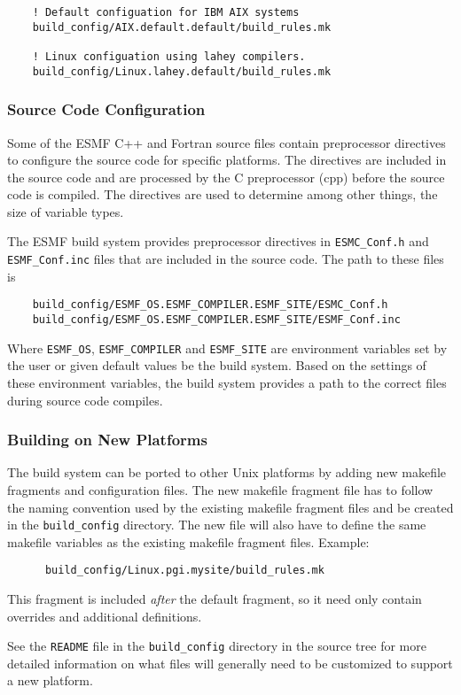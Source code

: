 \begin{verbatim}
    ! Default configuation for IBM AIX systems
    build_config/AIX.default.default/build_rules.mk
    
    ! Linux configuation using lahey compilers.    
    build_config/Linux.lahey.default/build_rules.mk
\end{verbatim}

\subsubsection{Source Code Configuration}

Some of the ESMF C++ and Fortran source files contain preprocessor directives
to configure the source code for specific platforms.  The directives are 
included in the source code and are processed by the C preprocessor (cpp) 
before the source code is compiled.  The directives are used to determine among
other things, the size of variable types.

The ESMF build system provides preprocessor directives in 
{\tt ESMC\_Conf.h} and {\tt ESMF\_Conf.inc} files
that are included in the source code.  The path to these files is

\begin{verbatim}
    build_config/ESMF_OS.ESMF_COMPILER.ESMF_SITE/ESMC_Conf.h
    build_config/ESMF_OS.ESMF_COMPILER.ESMF_SITE/ESMF_Conf.inc
\end{verbatim}

Where {\tt ESMF\_OS}, {\tt ESMF\_COMPILER} and {\tt ESMF\_SITE} are
environment variables set by the user or given default values be the
build system.  Based on the settings of these environment variables,
the build system provides a path to the correct files during
source code compiles.

\subsubsection{Building on New Platforms}

The build system can be ported to other Unix platforms by adding new
makefile fragments and configuration files.  The new makefile fragment 
file has to follow the naming convention used by the existing makefile 
fragment files and be created in the {\tt build\_config} directory. The 
new file will also have to define the same makefile variables as the existing
makefile fragment files. Example:

\begin{verbatim}
      build_config/Linux.pgi.mysite/build_rules.mk
\end{verbatim}

This fragment is included {\it after} the default fragment, so it need
only contain overrides and additional definitions.

See the {\tt README} file in the {\tt build\_config} directory in the
source tree for more detailed information on what files will generally
need to be customized to support a new platform.
